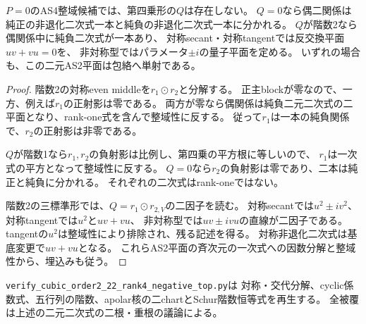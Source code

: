 \begin{corollary}[零正topに残る負平面]
\label{cor:h3-order2-22-rank4-zero-positive}
$P=0$のAS4整域候補では、第四乗形の$Q$は存在しない。
$Q=0$なら偶二関係は純正の非退化二次式一本と純負の非退化二次式一本に分かれる。
$Q$が階数2なら偶関係中に純負二次式が一本あり、
対称secant・対称tangentでは反交換平面$uv+vu=0$を、
非対称型ではパラメータ$\pm i$の量子平面を定める。
いずれの場合も、この二元AS2平面は包絡へ単射である。
\end{corollary}
\begin{proof}
階数2の対称even middleを$r_1\mathbin{\odot}r_2$と分解する。
正主blockが零なので、一方、例えば$r_1$の正射影は零である。
両方が零なら偶関係は純負二元二次式の二平面となり、rank-one式を含んで整域性に反する。
従って$r_1$は一本の純負関係で、$r_2$の正射影は非零である。

$Q$が階数1なら$r_1,r_2$の負射影は比例し、第四乗の平方根に等しいので、
$r_1$は一次式の平方となって整域性に反する。
$Q=0$なら$r_2$の負射影は零であり、二本は純正と純負に分かれる。
それぞれの二次式はrank-oneではない。

階数2の三標準形では、$Q=r_1\mathbin{\odot}r_{2,V}$の二因子を読む。
対称secantでは$u^2\pm i v^2$、対称tangentでは$u^2$と$uv+vu$、
非対称型では$uv\pm i vu$の直線が二因子である。
tangentの$u^2$は整域性により排除され、残る記述を得る。
対称非退化二次式は基底変更で$uv+vu$となる。
これらAS2平面の斉次元の一次式への因数分解と整域性から、埋込みも従う。
\end{proof}

\texttt{verify\_cubic\_order2\_22\_rank4\_negative\_top.py}は
対称・交代分解、cyclic係数式、五行列の階数、apolar核の二chartとSchur階数恒等式を再生する。
全被覆は上述の二元二次式の二根・重根の議論による。
